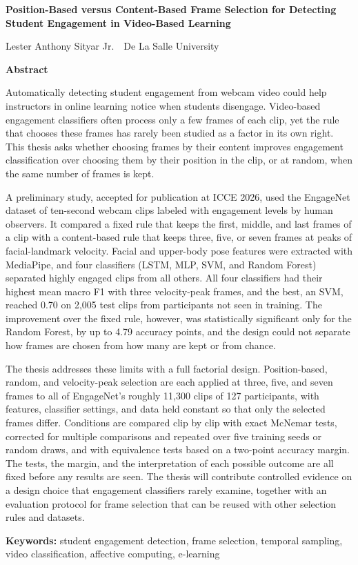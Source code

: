 \documentclass[11pt,a4paper]{article}
\newcommand{\thesistitle}{Position-Based versus Content-Based Frame Selection for Detecting Student Engagement in Video-Based Learning}
\begin{document}
\newpage

{\large\bfseries \thesistitle\par}
\vspace{1mm}
Lester Anthony Sityar Jr.\ \textperiodcentered\ De La Salle University

\vspace{3mm}
{\large\bfseries Abstract}

Automatically detecting student engagement from webcam video could help instructors in online learning notice when students disengage. Video-based engagement classifiers often process only a few frames of each clip, yet the rule that chooses these frames has rarely been studied as a factor in its own right. This thesis asks whether choosing frames by their content improves engagement classification over choosing them by their position in the clip, or at random, when the same number of frames is kept.

A preliminary study, accepted for publication at ICCE 2026, used the EngageNet dataset of ten-second webcam clips labeled with engagement levels by human observers. It compared a fixed rule that keeps the first, middle, and last frames of a clip with a content-based rule that keeps three, five, or seven frames at peaks of facial-landmark velocity. Facial and upper-body pose features were extracted with MediaPipe, and four classifiers (LSTM, MLP, SVM, and Random Forest) separated highly engaged clips from all others. All four classifiers had their highest mean macro F1 with three velocity-peak frames, and the best, an SVM, reached 0.70 on 2,005 test clips from participants not seen in training. The improvement over the fixed rule, however, was statistically significant only for the Random Forest, by up to 4.79 accuracy points, and the design could not separate how frames are chosen from how many are kept or from chance.

The thesis addresses these limits with a full factorial design. Position-based, random, and velocity-peak selection are each applied at three, five, and seven frames to all of EngageNet's roughly 11,300 clips of 127 participants, with features, classifier settings, and data held constant so that only the selected frames differ. Conditions are compared clip by clip with exact McNemar tests, corrected for multiple comparisons and repeated over five training seeds or random draws, and with equivalence tests based on a two-point accuracy margin. The tests, the margin, and the interpretation of each possible outcome are all fixed before any results are seen. The thesis will contribute controlled evidence on a design choice that engagement classifiers rarely examine, together with an evaluation protocol for frame selection that can be reused with other selection rules and datasets.

\vspace{2mm}
\textbf{Keywords:} student engagement detection, frame selection, temporal sampling, video classification, affective computing, e-learning
\end{document}
